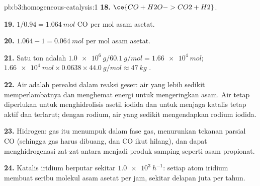 \begin{solution}{pb:b3:homogeneous-catalysis:1}
\textbf{18.} $\ce{CO + H2O -> CO2 + H2}$.

\textbf{19.} $1/0.94 = \qty{1.064}{mol}$ CO per mol asam asetat.

\textbf{20.} $1.064 - 1 = \qty{0.064}{mol}$  per mol asam asetat.

\textbf{21.} Satu ton adalah $\qty{1.0e6}{g}/\qty{60.1}{g/mol} = \qty{1.66e4}{mol}$; $\qty{1.66e4}{mol} \times 0.0638 \times \qty{44.0}{g/mol} \approx \qty{47}{kg}$ .

\textbf{22.} Air adalah pereaksi dalam reaksi geser: air yang lebih sedikit memperlambatnya dan menghemat energi
untuk mengeringkan asam. Air tetap diperlukan untuk menghidrolisis asetil iodida dan untuk menjaga
katalis tetap aktif dan terlarut; dengan rodium, air yang sedikit mengendapkan rodium
iodida.

\textbf{23.} Hidrogen: gas itu menumpuk dalam fase gas, menurunkan tekanan parsial CO
(sehingga gas harus dibuang, dan CO ikut hilang), dan dapat menghidrogenasi zat-zat antara menjadi
produk samping seperti asam propionat.

\textbf{24.} Katalis iridium berputar sekitar $\qty{1.0e3}{h^{-1}}$: setiap atom iridium membuat
seribu molekul asam asetat per jam, sekitar delapan juta per tahun.
\end{solution}
